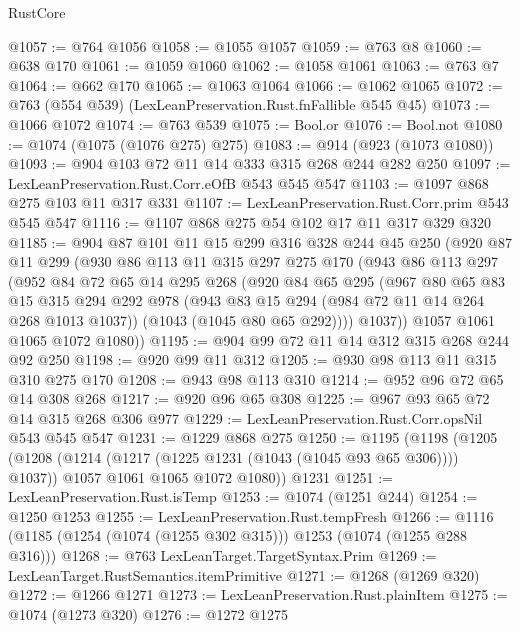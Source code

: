 \begin{lexlean}{RustCore}
\begin{coremodule}
@1057 := @764 @1056
@1058 := @1055 @1057
@1059 := @763 @8
@1060 := @638 @170
@1061 := @1059 @1060
@1062 := @1058 @1061
@1063 := @763 @7
@1064 := @662 @170
@1065 := @1063 @1064
@1066 := @1062 @1065
@1072 := @763 (@554 @539) (LexLeanPreservation.Rust.fnFallible @545 @45)
@1073 := @1066 @1072
@1074 := @763 @539
@1075 := Bool.or
@1076 := Bool.not
@1080 := @1074 (@1075 (@1076 @275) @275)
@1083 := @914 (@923 (@1073 @1080))
@1093 := @904 @103 @72 @11 @14 @333 @315 @268 @244 @282 @250
@1097 := LexLeanPreservation.Rust.Corr.eOfB @543 @545 @547
@1103 := @1097 @868 @275 @103 @11 @317 @331
@1107 := LexLeanPreservation.Rust.Corr.prim @543 @545 @547
@1116 := @1107 @868 @275 @54 @102 @17 @11 @317 @329 @320
@1185 := @904
    @87
    @101
    @11
    @15
    @299
    @316
    @328
    @244
    @45
    @250
    (@920
      @87
      @11
      @299
      (@930
        @86
        @113
        @11
        @315
        @297
        @275
        @170
        (@943
          @86
          @113
          @297
          (@952
            @84
            @72
            @65
            @14
            @295
            @268
            (@920
              @84
              @65
              @295
              (@967
                @80
                @65
                @83
                @15
                @315
                @294
                @292
                @978
                (@943 @83 @15 @294 (@984 @72 @11 @14 @264 @268 @1013 @1037))
                (@1043 (@1045 @80 @65 @292))))
            @1037))
        @1057
        @1061
        @1065
        @1072
        @1080))
@1195 := @904 @99 @72 @11 @14 @312 @315 @268 @244 @92 @250
@1198 := @920 @99 @11 @312
@1205 := @930 @98 @113 @11 @315 @310 @275 @170
@1208 := @943 @98 @113 @310
@1214 := @952 @96 @72 @65 @14 @308 @268
@1217 := @920 @96 @65 @308
@1225 := @967 @93 @65 @72 @14 @315 @268 @306 @977
@1229 := LexLeanPreservation.Rust.Corr.opsNil @543 @545 @547
@1231 := @1229 @868 @275
@1250 := @1195
    (@1198
      (@1205
        (@1208 (@1214 (@1217 (@1225 @1231 (@1043 (@1045 @93 @65 @306)))) @1037))
        @1057
        @1061
        @1065
        @1072
        @1080))
    @1231
@1251 := LexLeanPreservation.Rust.isTemp
@1253 := @1074 (@1251 @244)
@1254 := @1250 @1253
@1255 := LexLeanPreservation.Rust.tempFresh
@1266 := @1116 (@1185 (@1254 (@1074 (@1255 @302 @315))) @1253 (@1074 (@1255 @288 @316)))
@1268 := @763 LexLeanTarget.TargetSyntax.Prim
@1269 := LexLeanTarget.RustSemantics.itemPrimitive
@1271 := @1268 (@1269 @320)
@1272 := @1266 @1271
@1273 := LexLeanPreservation.Rust.plainItem
@1275 := @1074 (@1273 @320)
@1276 := @1272 @1275

\end{coremodule}
\end{lexlean}
